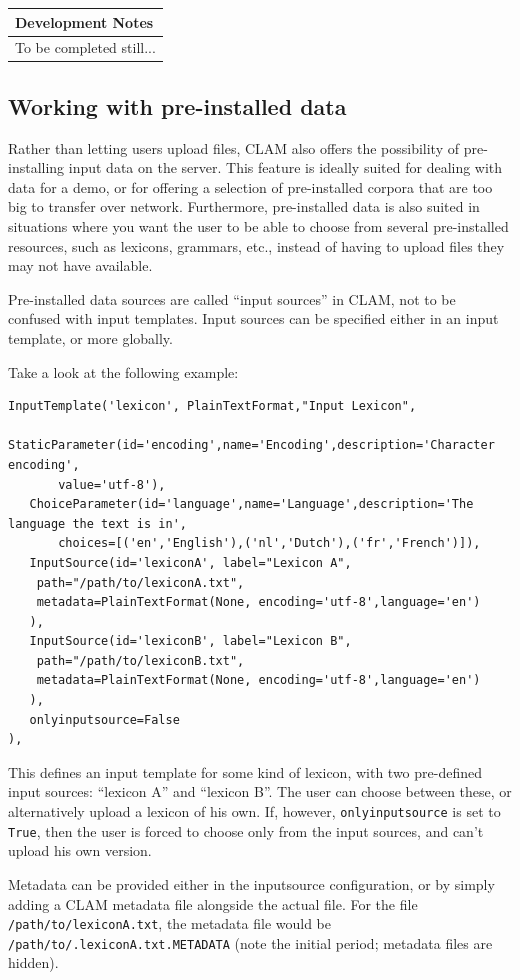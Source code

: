 \documentclass[a4paper,12pt]{report}
\newenvironment{devnotes}
{\newpage
\begin{center}
    \begin{tabular}[h!]{|p{0.8\textwidth}|}
    \hline
    {\bf Development Notes}\\\hline}
{   \\\hline
    \end{tabular}
\end{center}}
\begin{document}
\begin{devnotes}
To be completed still...
\end{devnotes}


\subsection{Working with pre-installed data}

Rather than letting users upload files, CLAM also offers the possibility of pre-installing input data on the server. This feature is ideally suited for dealing with data for a demo, or for offering a selection of pre-installed corpora that are too big to transfer over network. Furthermore, pre-installed data is also suited in situations where you want the user to be able to choose from several pre-installed resources, such as lexicons, grammars, etc., instead of having to upload files they may not have available.

Pre-installed data sources are called ``input sources'' in CLAM, not to be confused with input templates. Input sources can be specified either in an input template, or more globally. 

Take a look at the following example:

\begin{verbatim}
InputTemplate('lexicon', PlainTextFormat,"Input Lexicon", 
   StaticParameter(id='encoding',name='Encoding',description='Character encoding',
       value='utf-8'),
   ChoiceParameter(id='language',name='Language',description='The language the text is in', 
       choices=[('en','English'),('nl','Dutch'),('fr','French')]),
   InputSource(id='lexiconA', label="Lexicon A",
    path="/path/to/lexiconA.txt", 
    metadata=PlainTextFormat(None, encoding='utf-8',language='en')
   ),
   InputSource(id='lexiconB', label="Lexicon B",
    path="/path/to/lexiconB.txt", 
    metadata=PlainTextFormat(None, encoding='utf-8',language='en')
   ),
   onlyinputsource=False
),            
\end{verbatim}

This defines an input template for some kind of lexicon, with two pre-defined input sources: ``lexicon A'' and ``lexicon B''. The user can choose between these, or alternatively upload a lexicon of his own. If, however, \texttt{onlyinputsource} is set to \texttt{True}, then the user is forced to choose only from the input sources, and can't upload his own version. 

Metadata can be provided either in the inputsource configuration, or by simply adding a CLAM metadata file alongside the actual file. For the file \texttt{/path/to/lexiconA.txt}, the metadata file would be \texttt{/path/to/.lexiconA.txt.METADATA} (note the initial period; metadata files are hidden). 
\end{document}
